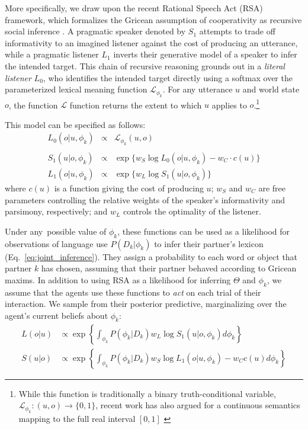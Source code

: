 More specifically, we draw upon the recent Rational Speech Act (RSA) framework, which formalizes the Gricean assumption of cooperativity as recursive social inference \cite{frank_predicting_2012,GoodmanFrank16_RSATiCS,FrankeJager16_ProbabilisticPragmatics}.
A pragmatic speaker denoted by $S_1$ attempts to trade off informativity to an imagined listener against the cost of producing an utterance, while a pragmatic listener $L_1$ inverts their generative model of a speaker to infer the intended target.
This chain of recursive reasoning grounds out in a \emph{literal listener} $L_0$, who identifies the intended target directly using a softmax over the parameterized lexical meaning function $\mathcal{L}_{\phi_k}$.
For any utterance $u$ and world state $o$, the function $\mathcal{L}$ function returns the extent to which $u$ applies to $o$.\footnote{While this function is traditionally a binary truth-conditional variable, $\mathcal{L}_{\phi_k}: (u,o) \rightarrow \{0,1\}$, recent work has also argued for a continuous semantics mapping to the full real interval $[0,1]$  \cite{degen2020redundancy}}

This model can be specified as follows:
$$
\begin{array}{rcl}
L_0(o | u, \phi_k) &\propto  & \mathcal{L}_{\phi_k}(u,o)\label{eq:RSA}\\ \\
S_1(u | o, \phi_k) &\propto &  \exp\{w_S \log L_0(o | u, \phi_k) - w_C \cdot c(u)\}   \\
L_1(o | u, \phi_k) &\propto  & \exp\{w_L \log S_1(u | o, \phi_k)\}
\end{array}
$$
where $c(u)$ is a function giving the cost of producing $u$; $w_S$ and $w_C$ are free parameters controlling the relative weights of the speaker's informativity and parsimony, respectively; and $w_L$ controls the optimality of the listener.

Under any possible value of $\phi_k$, these functions can be used as a likelihood for observations of language use $P(D_k | \phi_k)$ to infer their partner's lexicon (Eq.~\ref{eq:joint_inference}).
They assign a probability to each word or object that partner $k$ has chosen, assuming that their partner behaved according to Gricean maxims.
In addition to using RSA as a likelihood for inferring $\Theta$ and $\phi_k$, we assume that the agents use these functions to \emph{act} on each trial of their interaction.
We sample from their posterior predictive, marginalizing over the agent's current beliefs about $\phi_k$:
\begin{align}
L(o|u) &\propto   \exp\left\{ \textstyle{\int_{\phi_k}} P(\phi_k | D_k) w_L \log S_1(u|o, \phi_k)d\phi_k\right\}\label{eq:marginalized}\\
S(u|o) &\propto  \exp\left\{ \textstyle{\int_{\phi_k}} P(\phi_k | D_k)  w_S \log L_1(o| u, \phi_k) - w_C c(u)d\phi_k\right\}\nonumber
\end{align}

